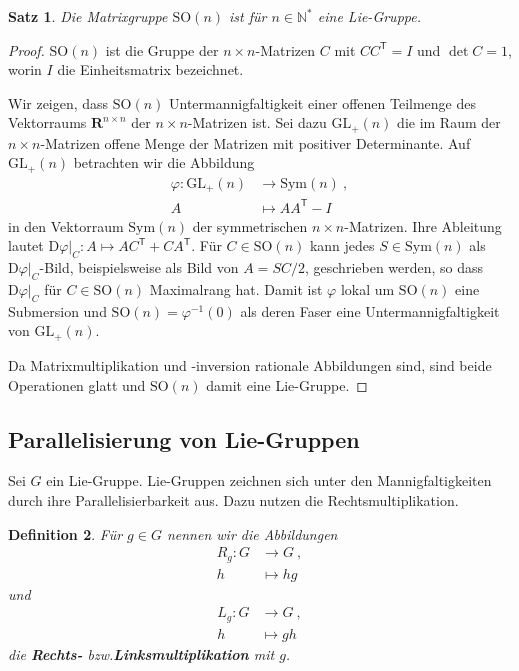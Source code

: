 \documentclass[10pt,a4paper]{article}
\theoremstyle{mytheorem}
\newtheorem{theorem}{Satz}[section]
\theoremstyle{mydefinition}
\newtheorem{definition}[theorem]{Definition}
\newcommand{\mydef}[1]{\textbf{\textit{#1}}}
\newcommand{\trans}{^\mathsf{T}}
\newcommand{\Dt}{\mathrm{D}}
\newcommand{\SO}{\mathrm{SO}}
\begin{document}
\begin{theorem}
\label{th:SO3}
Die Matrixgruppe $\SO(n)$ ist für $n\in\mathbb{N}^*$ eine Lie-Gruppe.
\end{theorem}
\begin{proof}
$\SO(n)$ ist die Gruppe der $n\times n$-Matrizen $C$ mit $CC\trans=I$ und $\det C=1$, worin $I$ die Einheitsmatrix bezeichnet.

Wir zeigen, dass $\SO(n)$ Untermannigfaltigkeit einer offenen Teilmenge des  Vektorraums $\mathbf{R}^{n\times n}$ der $n\times n$-Matrizen ist.
Sei dazu $\mathrm{GL}_+(n)$ die im Raum der $n\times n$-Matrizen offene Menge der Matrizen mit positiver Determinante.
Auf $\mathrm{GL}_+(n)$ betrachten wir die Abbildung
\begin{align*}
	\varphi: 
	\mathrm{GL}_+(n) &\rightarrow \mathrm{Sym}(n)
	\ ,\nonumber\\
	A &\mapsto AA\trans - I
\end{align*}
in den Vektorraum $\mathrm{Sym}(n)$ der symmetrischen $n\times n$-Matrizen.
Ihre Ableitung lautet $\Dt\varphi|_C: A\mapsto AC\trans + CA\trans$.
Für $C\in\SO(n)$ kann jedes $S\in\mathrm{Sym}(n)$ als $\Dt\varphi|_C$-Bild, beispielsweise als Bild von $A=SC/2$, geschrieben werden, so dass $\Dt\varphi|_C$ für $C\in\SO(n)$ Maximalrang hat.
Damit ist $\varphi$ lokal um $\SO(n)$ eine Submersion und $\SO(n)=\varphi^{-1}(0)$ als deren Faser eine Untermannigfaltigkeit von $\mathrm{GL}_+(n)$.

Da Matrixmultiplikation und -inversion rationale Abbildungen sind, sind beide Operationen glatt und $\SO(n)$ damit eine Lie-Gruppe.
\end{proof}


\subsection{Parallelisierung von Lie-Gruppen}

Sei $G$ ein Lie-Gruppe.
Lie-Gruppen zeichnen sich unter den Mannigfaltigkeiten durch ihre Parallelisierbarkeit aus.
Dazu nutzen die Rechtsmultiplikation.

\begin{definition}
Für $g\in G$ nennen wir die Abbildungen
\begin{align*}
	R_g: G &\rightarrow G
	\ ,\nonumber\\
	h &\mapsto hg
\end{align*}
und
\begin{align*}
	L_g: G &\rightarrow G
	\ ,\nonumber\\
	h &\mapsto gh
\end{align*}
die \mydef{Rechts-} bzw.\mydef{Linksmultiplikation} mit $g$.
\end{definition}
\end{document}
